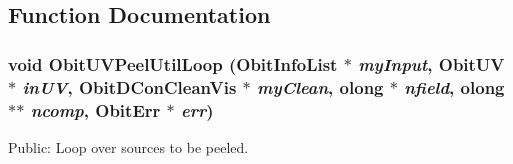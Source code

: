\subsection{Function Documentation}
\subsubsection{\setlength{\rightskip}{0pt plus 5cm}void Obit\-UVPeel\-Util\-Loop ({\bf Obit\-Info\-List} $\ast$ {\em my\-Input}, {\bf Obit\-UV} $\ast$ {\em in\-UV}, {\bf Obit\-DCon\-Clean\-Vis} $\ast$ {\em my\-Clean}, {\bf olong} $\ast$ {\em nfield}, {\bf olong} $\ast$$\ast$ {\em ncomp}, {\bf Obit\-Err} $\ast$ {\em err})}\label{ObitUVPeelUtil_8h_a1}


Public: Loop over sources to be peeled. 

